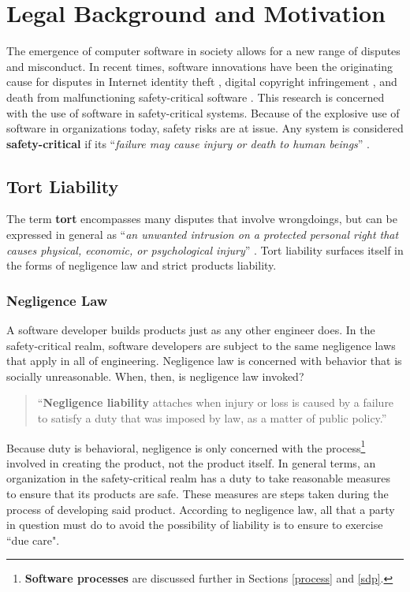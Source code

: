 \section{Legal Background and Motivation}\label{legal}
The emergence of computer software in society allows for a new range of disputes
and misconduct. In recent times, software innovations have been the originating
cause for disputes in Internet identity theft \cite{Valetk2004}, digital 
copyright infringement \cite{Manesh2006}, and death from malfunctioning 
safety-critical software \cite{Leveson1993}. This research is concerned with the
use of software in safety-critical systems. Because of the explosive use of
software in organizations today, safety risks are at issue. Any system is 
considered \textbf{safety-critical} if its ``\textit{failure may cause injury or
death to human beings}'' \cite{FOLDOC}.

\subsection{Tort Liability}
The term \textbf{tort} encompasses many disputes that involve wrongdoings, but 
can be expressed in general as ``\textit{an unwanted intrusion on a protected
personal right that causes physical, economic, or psychological injury}'' 
\cite{Burgunder2004}. Tort liability surfaces itself in the forms of negligence
law and strict products liability.

\subsubsection{Negligence Law}
A software developer builds products just as any other engineer does. In the
safety-critical realm, software developers are subject to the same negligence
laws that apply in all of engineering. Negligence law is concerned with behavior
that is socially unreasonable. When, then, is negligence law invoked?

\begin{quote}
``\textbf{Negligence liability} attaches when injury or loss is caused by a 
failure to satisfy a duty that was imposed by law, as a matter of public
policy.'' \cite{Kaner_neg_1995}
\end{quote}

Because duty is behavioral, negligence is only concerned with the
process\footnote{\textbf{Software processes} are discussed further in
Sections \ref{process} and \ref{sdp}.} involved in creating the product, not the
product itself. In general terms, an organization in the safety-critical realm
has a duty to take reasonable measures to ensure that its products are safe.
These measures are steps taken during the process of developing said product. 
According to negligence law, all that a party in question must do to avoid the 
possibility of liability is to ensure to exercise ``due care".

